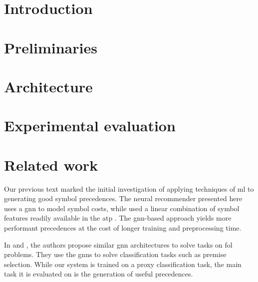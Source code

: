 \documentclass[runningheads]{llncs}
\begin{document}
\maketitle

\begin{abstract}

\end{abstract}

\section{Introduction}



\section{Preliminaries}
\label{sec:preliminaries}


\section{Architecture}
\label{sec:architecture}


\section{Experimental evaluation}
\label{sec:evaluation}


\section{Related work}
\label{sec:related}

Our previous text \cite{DBLP:conf/cade/Bartek020} marked the initial investigation of applying techniques of \gls{ml}
to generating good symbol precedences.
The neural recommender presented here uses a \gls{gnn} to model symbol costs,
while \cite{DBLP:conf/cade/Bartek020} used a linear combination of symbol features readily available in the \gls{atp} \Vampire{}.
The \gls{gnn}-based approach yields more performant precedences at the cost of longer training and preprocessing time.

In \cite{Olsak2019} and \cite{Rawson2020}, the authors propose similar \gls{gnn} architectures to solve tasks on \gls{fol} problems.
They use the \glspl{gnn} to solve classification tasks such as premise selection.
While our system is trained on a proxy classification task,
the main task it is evaluated on is the generation of useful precedences.
\end{document}

